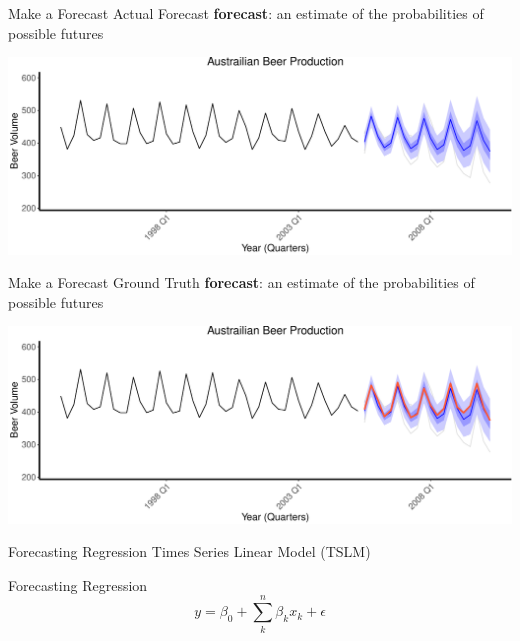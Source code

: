 \documentclass[
  ignorenonframetext,
]{beamer}
\begin{document}
\begin{frame}{Make a Forecast \textbar{} \small Actual Forecast}
\protect\hypertarget{make-a-forecast-actual-forecast}{}
\textbf{forecast}: an estimate of the probabilities of possible futures

\vpsace{2cm}

\includegraphics{Time-series-regression-models_files/figure-beamer/unnamed-chunk-7-1.pdf}
\end{frame}

\begin{frame}{Make a Forecast \textbar{} \small Ground Truth}
\protect\hypertarget{make-a-forecast-ground-truth}{}
\textbf{forecast}: an estimate of the probabilities of possible futures

\vpsace{2cm}

\includegraphics{Time-series-regression-models_files/figure-beamer/unnamed-chunk-8-1.pdf}
\end{frame}

\begin{frame}{Forecasting \textbar{} \small Regression}
\protect\hypertarget{forecasting-regression}{}
\center Times Series Linear Model (TSLM)
\end{frame}

\begin{frame}{Forecasting \textbar{} \small Regression}
\protect\hypertarget{forecasting-regression-1}{}
\[
y = \beta_0 + \sum_k^n \beta_k x_k + \epsilon
\]
\end{frame}
\end{document}
